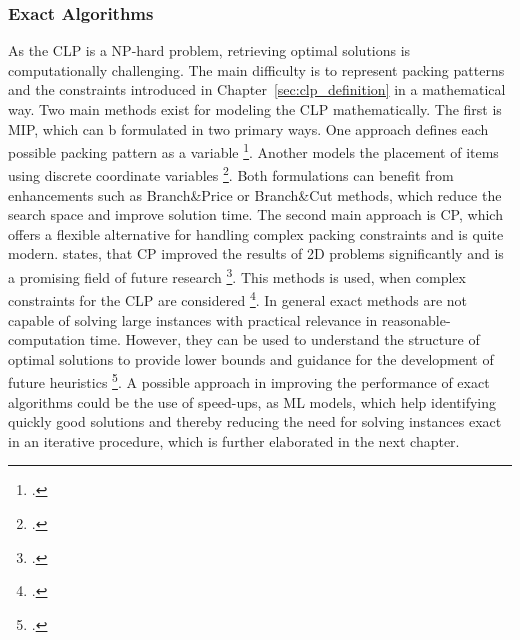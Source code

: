 \subsubsection{Exact Algorithms}
As the \gls{CLP} is a NP-hard problem, retrieving optimal solutions is computationally
challenging. The main difficulty is to represent packing patterns and the constraints
introduced in Chapter~\ref{sec:clp_definition} in a mathematical way. Two main methods
exist for modeling the \gls{CLP} mathematically. The first is \gls{MIP}, which can b
formulated in two primary ways. One approach defines each possible packing pattern as
a variable \footcite[cf.][pp. 29--30]{zhu_prototype_2012}. Another models
the placement of items using discrete coordinate variables \footcite[cf.][pp. 4--8]{moura_integrated_2009}.
Both formulations can benefit from enhancements such as Branch\&Price or Branch\&Cut
methods, which reduce the search space and improve solution time.
The second main approach is \gls{CP}, which offers a flexible alternative for handling
complex packing constraints and is quite modern. \citeauthor*{iori_exact_2021} states, that
\gls{CP} improved the results of 2D problems significantly and is a promising
field of future research  \footcite[cf.][p. 23]{iori_exact_2021}. This methods is used, when
complex constraints for the \gls{CLP} are considered \footcites[cf.][pp. 5--8]{kucuk_constraint_2022}[cf.][pp. 7--11]{tamke_branch-and-cut_2024}.
In general exact methods are not capable of solving large instances with practical relevance
in reasonable-computation time. However, they can be used to understand the structure
of optimal solutions to provide lower bounds and guidance for the development of future
heuristics \footcite[cf.][p.2]{tamke_branch-and-cut_2024}. A possible approach in improving
the performance of exact algorithms could be the use of speed-ups, as \gls{ML} models, which
help identifying quickly good solutions and thereby reducing the need for solving instances
exact in an iterative procedure, which is further elaborated in the next chapter.